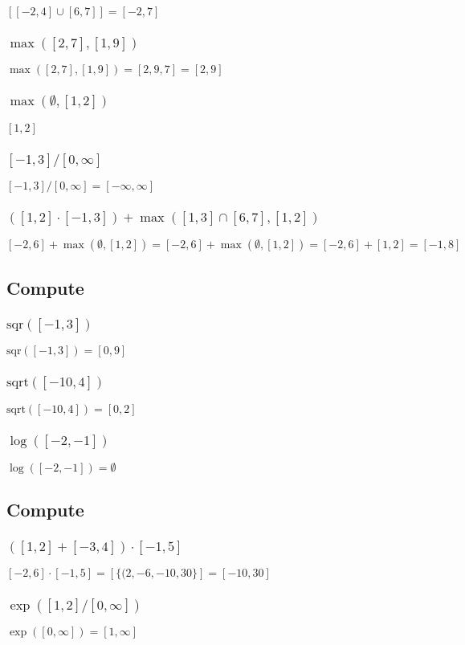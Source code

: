\documentclass[11pt]{article}
\begin{document}
\([[-2,4]\cup [6,7]]=[-2,7]\)
\subsubsection{\(\max([2,7],[1,9])\)}
\label{sec:orgb98c930}

\(\max([2,7],[1,9])=[2,9,7]=[2,9]\)
\subsubsection{\(\max(\emptyset,[1,2])\)}
\label{sec:org55108f4}

\([1,2]\)
\subsubsection{\([-1,3]/[0,\infty]\)}
\label{sec:org45a7435}

\([-1,3]/[0,\infty]=[-\infty,\infty]\)
\subsubsection{\(([1,2]\cdot[-1,3])+\max([1,3]\cap[6,7],[1,2])\)}
\label{sec:orgc602416}

\([-2,6]+\max(\emptyset,[1,2])=[-2,6]+\max(\emptyset,[1,2])=[-2,6]+[1,2]=[-1,8]\)
\subsection{Compute}
\label{sec:org76ff3bb}
\subsubsection{\(\text{sqr}([-1,3])\)}
\label{sec:org8c2d39c}

\(\text{sqr}([-1,3])=[0,9]\)
\subsubsection{\(\text{sqrt}([-10,4])\)}
\label{sec:org5dcbc32}

\(\text{sqrt}([-10,4])=[0,2]\)
\subsubsection{\(\log([-2,-1])\)}
\label{sec:orgdf60e0c}

\(\log([-2,-1])=\emptyset\)
\subsection{Compute}
\label{sec:org850153e}
\subsubsection{\(([1,2]+[-3,4])\cdot[-1,5]\)}
\label{sec:org7412397}

\([-2,6]\cdot[-1,5]=[\{(2,-6,-10,30\}]=[-10,30]\)
\subsubsection{\(\exp([1,2]/[0,\infty])\)}
\label{sec:orgbdecc3d}

\(\exp([0,\infty])=[1,\infty]\)
\end{document}
